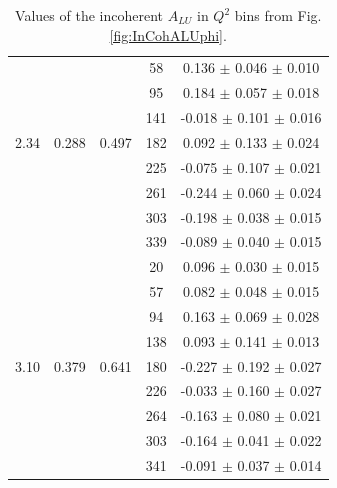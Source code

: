 \documentclass{article}
\begin{document}
\begin{table}[!h]
\begin{center}
\begin{tabular}{|c|c|c|c|c|}
        &       &        &   58   &   0.136  $\pm$  0.046   $\pm$ 0.010  \\
        &       &        &   95   &   0.184  $\pm$  0.057   $\pm$ 0.018  \\
        &       &        &  141   &  -0.018  $\pm$  0.101   $\pm$ 0.016  \\
  2.34  & 0.288 & 0.497  &  182   &   0.092  $\pm$  0.133   $\pm$ 0.024  \\
        &       &        &  225   &  -0.075  $\pm$  0.107   $\pm$ 0.021  \\
        &       &        &  261   &  -0.244  $\pm$  0.060   $\pm$ 0.024  \\
        &       &        &  303   &  -0.198  $\pm$  0.038   $\pm$ 0.015  \\
        &       &        &  339   &  -0.089  $\pm$  0.040   $\pm$ 0.015  \\
  \hline 
        &       &        &   20   &   0.096  $\pm$  0.030   $\pm$ 0.015  \\ 
        &       &        &   57   &   0.082  $\pm$  0.048   $\pm$ 0.015  \\
        &       &        &   94   &   0.163  $\pm$  0.069   $\pm$ 0.028  \\
        &       &        &  138   &   0.093  $\pm$  0.141   $\pm$ 0.013  \\
  3.10  & 0.379 & 0.641  &  180   &  -0.227  $\pm$  0.192   $\pm$ 0.027  \\
        &       &        &  226   &  -0.033  $\pm$  0.160   $\pm$ 0.027  \\
        &       &        &  264   &  -0.163  $\pm$  0.080   $\pm$ 0.021  \\
        &       &        &  303   &  -0.164  $\pm$  0.041   $\pm$ 0.022  \\
        &       &        &  341   &  -0.091  $\pm$  0.037   $\pm$ 0.014  \\
 \hline
      \end{tabular}
      \caption{Values of the incoherent $A_{LU}$ in $Q^2$ bins from Fig. \ref{fig:InCohALUphi}.}
      \label{table:InCoh_Q2_BSA}
   \end{center}
\end{table}
\end{document}
